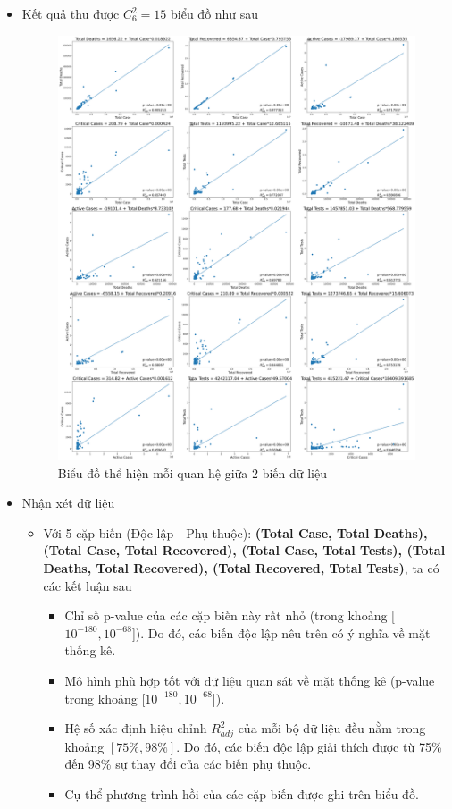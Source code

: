 \documentclass[a4paper, 12pt]{article}
\begin{document}
\begin{itemize}
        \item Kết quả thu được $C_6^2 = 15$  biểu đồ như sau
        \begin{figure}[H]
            \begin{center}
                \includegraphics[scale=0.2]{img/scatter.png}
                \caption{Biểu đồ thể hiện mỗi quan hệ giữa 2 biến dữ liệu}
            \end{center}
        \end{figure}

        \item Nhận xét dữ liệu
        \begin{itemize}
            \item Với 5 cặp biến (Độc lập - Phụ thuộc): \textbf{(Total Case, Total Deaths), (Total Case, Total Recovered), (Total Case, Total Tests), (Total Deaths, Total Recovered), (Total Recovered, Total Tests)}, ta có các kết luận sau
            \begin{itemize}
                \item Chỉ số p-value của các cặp biến này rất nhỏ (trong khoảng [$10^{-180}, 10^{-68}$]). Do đó, các biến độc lập nêu trên có ý nghĩa về mặt thống kê.
                \item Mô hình phù hợp tốt với dữ liệu quan sát về mặt thống kê (p-value trong khoảng [$10^{-180}, 10^{-68}$]).
                \item Hệ số xác định hiệu chỉnh $R_{adj}^2$ của mỗi bộ dữ liệu đều nằm trong khoảng $[75\%, 98\%]$. Do đó, các biến độc lập giải thích được từ 75\% đến 98\% sự thay đổi của các biến phụ thuộc.
                \item Cụ thể phương trình hồi của các cặp biến được ghi trên biểu đồ.
            \end{itemize}


\end{itemize}
\end{itemize}
\end{document}
